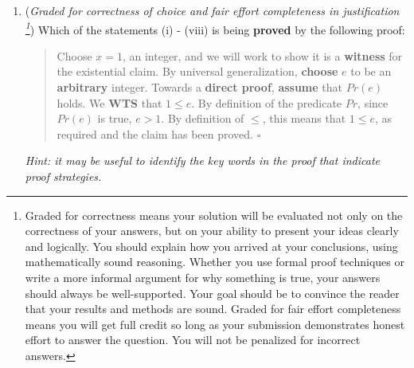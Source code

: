 \begin{enumerate}
\begin{enumerate}
   \item ({\it Graded for correctness of choice and fair effort completeness in justification
   \footnote{Graded for correctness means your solution will be
   evaluated not only on the correctness of your answers, but on your ability to 
   present your ideas clearly and logically. You should explain how you arrived at your conclusions, using 
   mathematically sound reasoning. Whether you use formal proof techniques or write a more informal argument for why 
   something is true, your answers should always be well-supported. Your goal should be to convince the reader that 
   your results and methods are sound. Graded for fair effort completeness means 
   you will get full credit so long as your submission demonstrates honest 
   effort to answer the question. You will not be penalized for incorrect answers.}}) 
   Which of the statements (i) - (viii) is being {\bf proved} by the following proof:
   \begin{quote}
     Choose $x = 1$, an integer, and we will work to show
     it is a {\bf witness} for the existential claim. By universal generalization, {\bf choose} $e$ to be an {\bf arbitrary} integer. 
     Towards a {\bf direct proof}, {\bf assume} that $Pr(e)$ holds. We {\bf WTS} that $1 \leq e$.
     By definition of the  predicate $Pr$, since $Pr(e)$ is true, $e > 1$. By definition of $\leq$, 
     this means that $1 \leq e$, as required and the claim has been proved. $\square$
   \end{quote}
   
   
   {\it Hint: it may be useful to 
   identify the key words in the proof that indicate proof strategies.}
   

\end{enumerate}
\end{enumerate}
